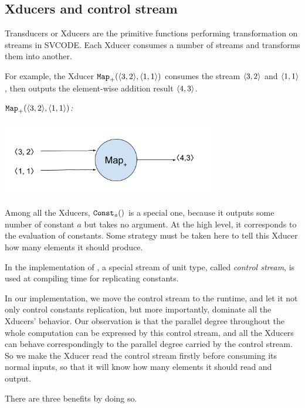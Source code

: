 \subsection{Xducers and control stream}

Transducers or Xducers are the primitive functions performing transformation on streams in SVCODE. 
Each Xducer consumes a number of streams and transforms them into another. 

For example, the Xducer $\map{+}(\<3,2\'>, \< 1,1\'>)$ consumes the stream $\<3,2\'>$ and $\< 1,1\'>$, then outputs 
the element-wise addition result $\<4, 3\'>$. 

\begin{example} \emph{$\map{+}(\<3,2\'>, \< 1,1\'>)$:}\\
	\begin{center}
		\includegraphics[width=0.7\textwidth]{fig/mapxducer.png}
	\end{center}
\end{example}


Among all the Xducers, $\mathtt{Const_{\mathit a}()}$ is a special one, because it outputs some number of constant $a$ but takes no argument.  
At the high level, it corresponds to the evaluation of constants.
Some strategy must be taken here to tell this Xducer how many elements it should produce.

In the implementation of \cite{MF16}, a special stream of unit type, called \emph{control stream}, is used at compiling time for replicating constants.

In our implementation, we move the control stream to the runtime, and let it not only control constants replication, but more importantly, dominate all the Xducers' behavior. 
Our observation is that the parallel degree throughout the whole computation can be expressed by this control stream, and all the Xducers can behave correspondingly to the parallel degree carried by the control stream. 
So we make the Xducer read the control stream firstly before consuming its normal inputs, so that it will know how many elements it should read and output.

There are three benefits by doing so.

